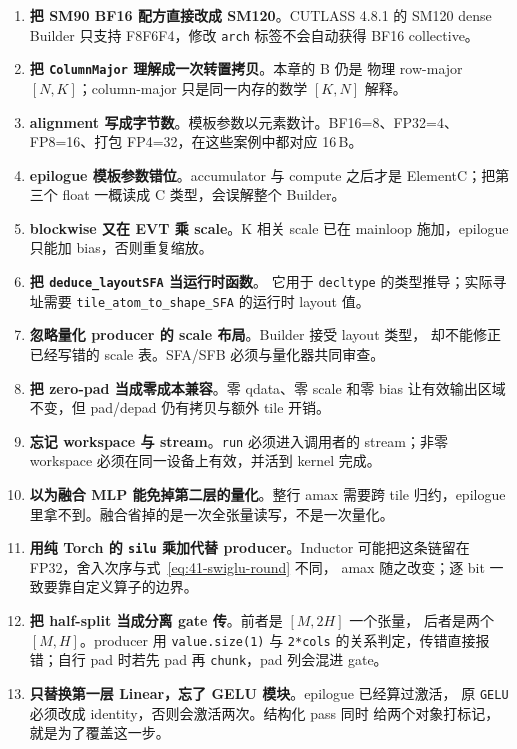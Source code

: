 \begin{enumerate}[itemsep=1pt,topsep=2pt]
  \item \textbf{把 SM90 BF16 配方直接改成 SM120}。CUTLASS 4.8.1 的 SM120
        dense Builder 只支持 F8F6F4，修改 \texttt{arch} 标签不会自动获得
        BF16 collective。
  \item \textbf{把 \texttt{ColumnMajor} 理解成一次转置拷贝}。本章的 B 仍是
        物理 row-major $[N,K]$；column-major 只是同一内存的数学 $[K,N]$
        解释。
  \item \textbf{alignment 写成字节数}。模板参数以元素数计。BF16=8、FP32=4、
        FP8=16、打包 FP4=32，在这些案例中都对应 16\,B。
  \item \textbf{epilogue 模板参数错位}。accumulator 与 compute 之后才是
        ElementC；把第三个 float 一概读成 C 类型，会误解整个 Builder。
  \item \textbf{blockwise 又在 EVT 乘 scale}。K 相关 scale 已在 mainloop
        施加，epilogue 只能加 bias，否则重复缩放。
  \item \textbf{把 \texttt{deduce\_}\allowbreak\texttt{layoutSFA} 当运行时函数}。
        它用于 \texttt{decltype} 的类型推导；实际寻址需要
        \texttt{tile\_atom\_to\_shape\_}\allowbreak\texttt{SFA} 的运行时 layout 值。
  \item \textbf{忽略量化 producer 的 scale 布局}。Builder 接受 layout 类型，
        却不能修正已经写错的 scale 表。SFA/SFB 必须与量化器共同审查。
  \item \textbf{把 zero-pad 当成零成本兼容}。零 qdata、零 scale 和零 bias
        让有效输出区域不变，但 pad/depad 仍有拷贝与额外 tile 开销。
  \item \textbf{忘记 workspace 与 stream}。\texttt{run} 必须进入调用者的
        stream；非零 workspace 必须在同一设备上有效，并活到 kernel 完成。
  \item \textbf{以为融合 MLP 能免掉第二层的量化}。整行 amax 需要跨 tile
        归约，epilogue 里拿不到。融合省掉的是一次全张量读写，不是一次量化。
  \item \textbf{用纯 Torch 的 \texttt{silu} 乘加代替 producer}。Inductor
        可能把这条链留在 FP32，舍入次序与式~\ref{eq:41-swiglu-round} 不同，
        amax 随之改变；逐 bit 一致要靠自定义算子的边界。
  \item \textbf{把 half-split 当成分离 gate 传}。前者是 $[M,2H]$ 一个张量，
        后者是两个 $[M,H]$。producer 用 \texttt{value.size(1)} 与
        \texttt{2*cols} 的关系判定，传错直接报错；自行 pad 时若先 pad 再
        \texttt{chunk}，pad 列会混进 gate。
  \item \textbf{只替换第一层 Linear，忘了 GELU 模块}。epilogue 已经算过激活，
        原 \texttt{GELU} 必须改成 identity，否则会激活两次。结构化 pass 同时
        给两个对象打标记，就是为了覆盖这一步。
\end{enumerate}

